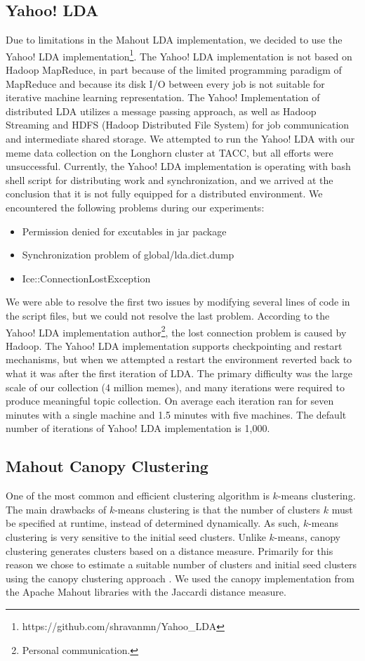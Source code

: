 \documentclass{sig-alternate}
\begin{document}
\subsection{Yahoo! LDA}
Due to limitations in the Mahout LDA implementation, we decided to use the Yahoo! LDA implementation\footnote{https://github.com/shravanmn/Yahoo\_LDA}. The Yahoo! LDA implementation is not based on Hadoop MapReduce, in part because of the limited programming paradigm of MapReduce and because its disk I/O between every job is not suitable for iterative machine learning representation. The Yahoo! Implementation of distributed LDA utilizes a message passing approach, as well as Hadoop Streaming and HDFS (Hadoop Distributed File System) for job communication and intermediate shared storage. We attempted to run the Yahoo! LDA with our meme data collection on the Longhorn cluster at TACC, but all efforts were unsuccessful. Currently, the Yahoo! LDA implementation is operating with bash shell script for distributing work and synchronization, and we arrived at the conclusion that it is not fully equipped for a distributed environment. We encountered the following problems during our experiments:
\begin{itemize}
 \item Permission denied for excutables in jar package
 \item Synchronization problem of global/lda.dict.dump
 \item Ice::ConnectionLostException
\end{itemize}
We were able to resolve the first two issues by modifying several lines of code in the script files, but we could not resolve the last problem. According to the Yahoo! LDA implementation author\footnote{Personal communication.}, the lost connection problem is caused by Hadoop. The Yahoo! LDA implementation supports checkpointing and restart mechanisms, but when we attempted a restart the environment reverted back to what it was after the first iteration of LDA. The primary difficulty was the large scale of our collection (4 million memes), and many iterations were required to produce meaningful topic collection. On average each iteration ran for seven minutes with a single machine and 1.5 minutes with five machines. The default number of iterations of Yahoo! LDA implementation is 1,000.

\subsection{Mahout Canopy Clustering}
One of the most common and efficient clustering algorithm is $k$-means clustering. The main drawbacks of $k$-means clustering is that the number of clusters $k$ must be specified at runtime, instead of determined dynamically. As such, $k$-means clustering is very sensitive to the initial seed clusters. Unlike $k$-means, canopy clustering generates clusters based on a distance measure. Primarily for this reason we chose to estimate a suitable number of clusters and initial seed clusters using the canopy clustering approach \cite{McCallum2000}. We used the canopy implementation from the Apache Mahout libraries with the Jaccardi distance measure.
\end{document}
